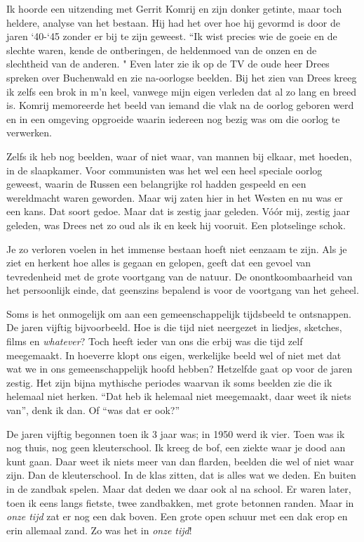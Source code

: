 \documentclass[12pt,twoside, openright]{memoir}
\begin{document}
Ik hoorde een uitzending met Gerrit Komrij en zijn donker getinte, maar toch heldere, analyse van het bestaan. Hij had het over hoe hij gevormd is door de jaren `40-`45 zonder er bij te zijn geweest. ``Ik wist precies wie de goeie en de slechte waren, kende de ontberingen, de heldenmoed van de onzen en de slechtheid van de anderen. " Even later zie ik op de TV de oude heer Drees spreken over Buchenwald en zie na-oorlogse beelden. Bij het zien van Drees kreeg ik zelfs een brok in m’n keel, vanwege mijn eigen verleden dat al zo lang en breed is. Komrij memoreerde het beeld van iemand die vlak na de oorlog geboren werd en in een omgeving opgroeide waarin iedereen nog bezig was om die oorlog te verwerken. 

Zelfs ik heb nog beelden, waar of niet waar, van mannen bij elkaar, met hoeden, in de slaapkamer. Voor communisten was het wel een heel speciale oorlog geweest, waarin de Russen een belangrijke rol hadden gespeeld en een wereldmacht waren geworden. Maar wij zaten hier in het Westen en nu was er een kans. Dat soort gedoe. Maar dat is zestig jaar geleden. Vóór mij, zestig jaar geleden, was Drees net zo oud als ik en keek hij vooruit. Een plotselinge schok.

Je zo verloren voelen in het immense bestaan hoeft niet eenzaam te zijn. Als je ziet en herkent hoe alles is gegaan en gelopen, geeft dat een gevoel van tevredenheid met de grote voortgang van de natuur. De onontkoombaarheid van het persoonlijk einde, dat geenszins bepalend is voor de voortgang van het geheel.

Soms is het onmogelijk om aan een gemeenschappelijk tijdsbeeld te ontsnappen. De jaren vijftig bijvoorbeeld. Hoe is die tijd niet neergezet in liedjes, sketches, films en \emph{whatever}? Toch heeft ieder van ons die erbij was die tijd zelf meegemaakt. In hoeverre klopt ons eigen, werkelijke beeld wel of niet met dat wat we in ons gemeenschappelijk hoofd hebben? Hetzelfde gaat op voor de jaren zestig. Het zijn bijna mythische periodes waarvan ik soms beelden zie die ik helemaal niet herken. ``Dat heb ik helemaal niet meegemaakt, daar weet ik niets van'', denk ik dan. Of ``was dat er ook?''

De jaren vijftig begonnen toen ik 3 jaar was; in 1950 werd ik vier. Toen was ik nog thuis, nog geen kleuterschool. Ik kreeg de bof, een ziekte waar je dood aan kunt gaan. Daar weet ik niets meer van dan flarden, beelden die wel of niet waar zijn. Dan de kleuterschool. In de klas zitten, dat is alles wat we deden. En buiten in de zandbak spelen. Maar dat deden we daar ook al na school. Er waren later, toen ik eens langs fietste, twee zandbakken, met grote betonnen randen. Maar in \emph{onze tijd} zat er nog een dak boven. Een grote open schuur met een dak erop en erin allemaal zand. Zo was het in \emph{onze tijd}!
\end{document}
